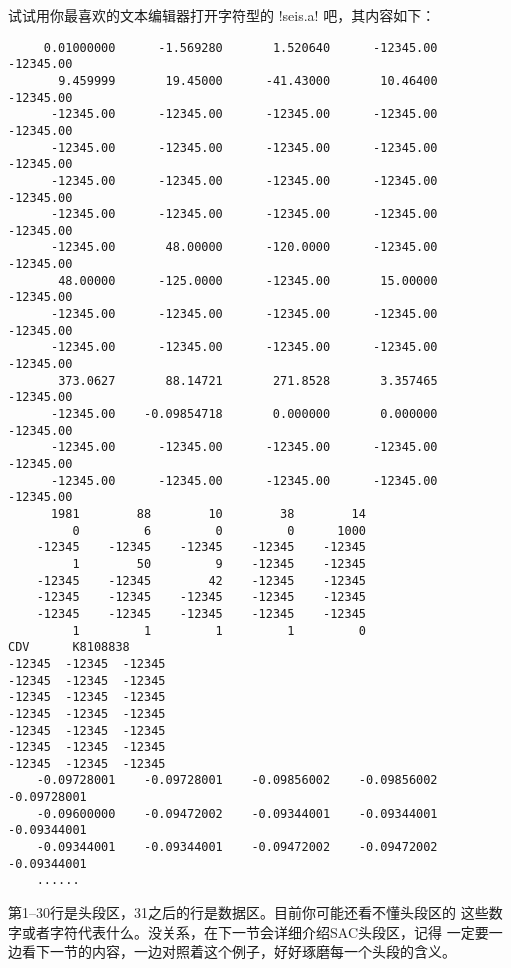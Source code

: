 试试用你最喜欢的文本编辑器打开字符型的 !seis.a! 吧，其内容如下：
\begin{verbatim}
     0.01000000      -1.569280       1.520640      -12345.00      -12345.00
       9.459999       19.45000      -41.43000       10.46400      -12345.00
      -12345.00      -12345.00      -12345.00      -12345.00      -12345.00
      -12345.00      -12345.00      -12345.00      -12345.00      -12345.00
      -12345.00      -12345.00      -12345.00      -12345.00      -12345.00
      -12345.00      -12345.00      -12345.00      -12345.00      -12345.00
      -12345.00       48.00000      -120.0000      -12345.00      -12345.00
       48.00000      -125.0000      -12345.00       15.00000      -12345.00
      -12345.00      -12345.00      -12345.00      -12345.00      -12345.00
      -12345.00      -12345.00      -12345.00      -12345.00      -12345.00
       373.0627       88.14721       271.8528       3.357465      -12345.00
      -12345.00    -0.09854718       0.000000       0.000000      -12345.00
      -12345.00      -12345.00      -12345.00      -12345.00      -12345.00
      -12345.00      -12345.00      -12345.00      -12345.00      -12345.00
      1981        88        10        38        14
         0         6         0         0      1000
    -12345    -12345    -12345    -12345    -12345
         1        50         9    -12345    -12345
    -12345    -12345        42    -12345    -12345
    -12345    -12345    -12345    -12345    -12345
    -12345    -12345    -12345    -12345    -12345
         1         1         1         1         0
CDV      K8108838
-12345  -12345  -12345
-12345  -12345  -12345
-12345  -12345  -12345
-12345  -12345  -12345
-12345  -12345  -12345
-12345  -12345  -12345
-12345  -12345  -12345
    -0.09728001    -0.09728001    -0.09856002    -0.09856002    -0.09728001
    -0.09600000    -0.09472002    -0.09344001    -0.09344001    -0.09344001
    -0.09344001    -0.09344001    -0.09472002    -0.09472002    -0.09344001
    ......
\end{verbatim}

第1--30行是头段区，31之后的行是数据区。目前你可能还看不懂头段区的
这些数字或者字符代表什么。没关系，在下一节会详细介绍SAC头段区，记得
一定要一边看下一节的内容，一边对照着这个例子，好好琢磨每一个头段的含义。
